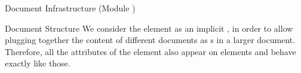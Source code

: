 \begin{tchapter}[id=omdoc-infrastructure,short=Document Infrastructure]{Document Infrastructure (Module {})}
\begin{tsection}[id=sectioning]{Document Structure}
We consider the {} element as an implicit {}, in order to
allow plugging together the content of different {\omdoc} documents as
{s} in a larger document. Therefore, all the attributes of the
{} element also appear on {} elements and behave exactly
like those.
\end{tsection}
\end{tchapter}


